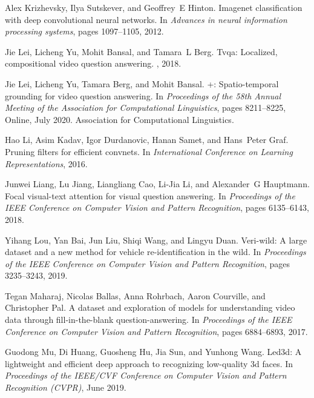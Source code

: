 \documentclass[final]{cvpr}
\begin{document}
{\begin{thebibliography}{10}
Alex Krizhevsky, Ilya Sutskever, and Geoffrey~E Hinton.
\newblock Imagenet classification with deep convolutional neural networks.
\newblock In {\em Advances in neural information processing systems}, pages
  1097--1105, 2012.

Jie Lei, Licheng Yu, Mohit Bansal, and Tamara~L Berg.
\newblock Tvqa: Localized, compositional video question answering.
, 2018.

Jie Lei, Licheng Yu, Tamara Berg, and Mohit Bansal.
+: Spatio-temporal grounding for video question answering.
\newblock In {\em Proceedings of the 58th Annual Meeting of the Association for
  Computational Linguistics}, pages 8211--8225, Online, July 2020. Association
  for Computational Linguistics.

Hao Li, Asim Kadav, Igor Durdanovic, Hanan Samet, and Hans~Peter Graf.
\newblock Pruning filters for efficient convnets.
\newblock In {\em International Conference on Learning Representations}, 2016.

Junwei Liang, Lu Jiang, Liangliang Cao, Li-Jia Li, and Alexander~G Hauptmann.
\newblock Focal visual-text attention for visual question answering.
\newblock In {\em Proceedings of the IEEE Conference on Computer Vision and
  Pattern Recognition}, pages 6135--6143, 2018.

Yihang Lou, Yan Bai, Jun Liu, Shiqi Wang, and Lingyu Duan.
\newblock Veri-wild: A large dataset and a new method for vehicle
  re-identification in the wild.
\newblock In {\em Proceedings of the IEEE Conference on Computer Vision and
  Pattern Recognition}, pages 3235--3243, 2019.

Tegan Maharaj, Nicolas Ballas, Anna Rohrbach, Aaron Courville, and Christopher
  Pal.
\newblock A dataset and exploration of models for understanding video data
  through fill-in-the-blank question-answering.
\newblock In {\em Proceedings of the IEEE Conference on Computer Vision and
  Pattern Recognition}, pages 6884--6893, 2017.

Guodong Mu, Di Huang, Guosheng Hu, Jia Sun, and Yunhong Wang.
\newblock Led3d: A lightweight and efficient deep approach to recognizing
  low-quality 3d faces.
\newblock In {\em Proceedings of the IEEE/CVF Conference on Computer Vision and
  Pattern Recognition (CVPR)}, June 2019.


\end{thebibliography}}
\end{document}
